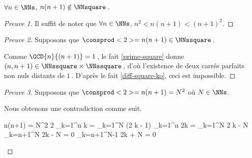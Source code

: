 \begin{fact} \label{case-2}
	 $\forall n \in \NNs$, $n(n+1) \notin \NNsquare$\,.
\end{fact}




\begin{proof}[Preuve 1]
	Il suffit de noter que $\forall n \in \NNs$, $n^2 < n(n+1) < (n+1)^2$.
\end{proof}




\begin{proof}[Preuve 2]
    Supposons que $\consprod<2> = n(n+1) \in \NNssquare$\,.
    
    \smallskip
    
    Comme $\GCD{n}{(n + 1)} = 1$\,, le fait \ref{prime-square} donne $(n, n + 1) \in \NNssquare \times \NNssquare$\,, d'où l'existence de deux carrés parfaits non nuls distants de $1$\,.
    D'après le fait \ref{diff-square-ko}, ceci est impossible.
\end{proof}




\begin{proof}[Preuve 3]
	Supposons que $\consprod<2> = n(n+1) = N^2$ où $N \in \NNs$.
     
    \smallskip
    
    Nous obtenons une contradiction comme suit.
	
	\medskip
	
	\begin{stepcalc}[style = ar*, ope = \iff]
		n(n+1) = N^2
		2 \dsum_{k=1}^{n} k = \dsum_{k=1}^{N} (2 k - 1)
	\explnext{}
		\dsum_{k=1}^{n} 2k = \dsum_{k=1}^{N} 2 k - N
		\dsum_{k=n+1}^{N} 2k - N = 0
		\dsum_{k=n+1}^{N-1} 2k + N = 0
	\end{stepcalc}

	\vspace{-2ex}	
	\leavevmode
\end{proof}


